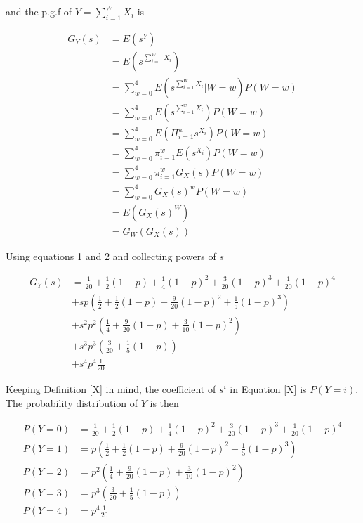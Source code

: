\documentclass{article}
\begin{document}
\begin{flushleft}
and the p.g.f of $Y = \sum_{i=1}^W X_i$ is 

\begin{equation} \label{eq1}
\begin{split}
G_Y(s) & = E(s^Y) \\
& = E(s^{\sum_{i=1}^W X_i}) \\
& = \sum_{w=0}^4 E(s^{\sum_{i=1}^W X_i} | W=w) P(W=w) \\
& = \sum_{w=0}^4 E(s^{\sum_{i=1}^w X_i}) P(W=w) \\
& = \sum_{w=0}^4 E(\Pi_{i=1}^w s^{X_i}) P(W=w) \\
& = \sum_{w=0}^4 \pi_{i=1}^w E(s^{X_i}) P(W=w) \\
& = \sum_{w=0}^4 \pi_{i=1}^w G_X(s) P(W=w) \\
& = \sum_{w=0}^4 G_X(s)^w P(W=w) \\
& = E(G_X(s)^W) \\
& = G_W(G_X(s))
\end{split}
\end{equation}

Using equations 1 and 2 and collecting powers of $s$

\begin{equation} \label{eq1}
\begin{split}
G_Y(s) & = \frac{1}{20} + \frac{1}{2}(1-p) + \frac{1}{4}(1-p)^2 + \frac{3}{20}(1-p)^3 + \frac{1}{20}(1-p)^4 \\
& + sp(\frac{1}{2} + \frac{1}{2}(1-p) + \frac{9}{20}(1-p)^2 + \frac{1}{5}(1-p)^3) \\
& + s^2 p^2(\frac{1}{4} + \frac{9}{20}(1-p) + \frac{3}{10}(1-p)^2) \\
& + s^3 p^3(\frac{3}{20} + \frac{1}{5}(1-p)) \\
& + s^4 p^4 \frac{1}{20}
\end{split}
\end{equation}

Keeping Definition [X] in mind, the coefficient of $s^i$ in Equation [X] is $P(Y=i)$. The probability distribution of $Y$ is then

\begin{equation} \label{eq1}
\begin{split}
P(Y = 0) & = \frac{1}{20} + \frac{1}{2}(1-p) + \frac{1}{4}(1-p)^2 + \frac{3}{20}(1-p)^3 + \frac{1}{20}(1-p)^4 \\
P(Y = 1) & = p(\frac{1}{2} + \frac{1}{2}(1-p) + \frac{9}{20}(1-p)^2 + \frac{1}{5}(1-p)^3) \\
P(Y = 2) & = p^2(\frac{1}{4} + \frac{9}{20}(1-p) + \frac{3}{10}(1-p)^2) \\
P(Y = 3) & = p^3(\frac{3}{20} + \frac{1}{5}(1-p)) \\
P(Y = 4) & = p^4 \frac{1}{20}
\end{split}
\end{equation}


\end{flushleft}
\end{document}
